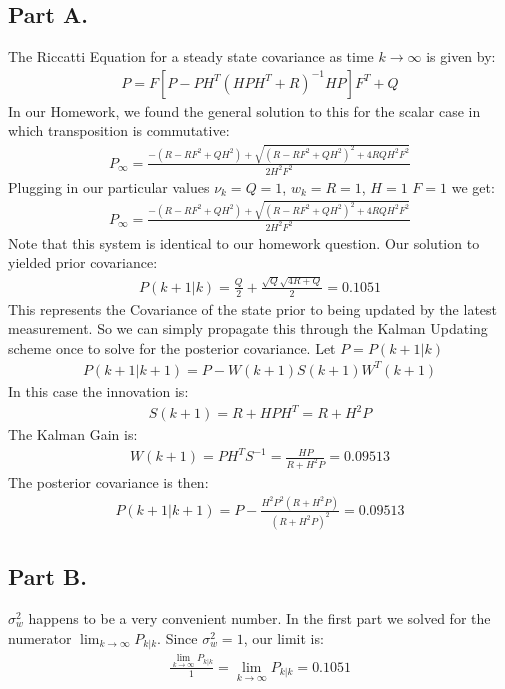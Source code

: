 \documentclass{article}
\begin{document}
\subsection*{Part A.}
The Riccatti Equation for a steady state covariance as time $k\rightarrow \infty$ is given by:
\begin{align*}
P = F[P-P H^T (HPH^T + R)^{-1} HP] F^T + Q
\end{align*}
In our Homework, we found the general solution to this for the scalar case in which transposition is commutative:
\begin{align*}
P_{\infty} = \frac{-(R-RF^2+Q H^2) + \sqrt{(R-RF^2 + QH^2)^2+4RQH^2F^2}}{2H^2 F^2}
\end{align*}
Plugging in our particular values $\nu_k = Q = 1$, $w_k = R = 1$, $H=1$ $F=1$ we get:
\begin{align*}
P_{\infty} = \frac{-(R-RF^2+Q H^2) + \sqrt{(R-RF^2 + QH^2)^2+4RQH^2F^2}}{2H^2 F^2}
\end{align*}
Note that this system is identical to our homework question. Our solution to yielded prior covariance:
\begin{align*}
\boxed{ P(k+1|k) = \frac{Q}{2} + \frac{\sqrt{Q} \sqrt{4R+Q}}{2} = 0.1051 }
\end{align*}
This represents the Covariance of the state prior to being updated by the latest measurement. So we can simply propagate this through the Kalman Updating scheme once to solve for the posterior covariance. Let $P=P(k+1|k)$
\begin{align*}
P(k+1|k+1) = P - W(k+1)S(k+1)W^T(k+1)
\end{align*}
In this case the innovation is:
\begin{align*}
S(k+1) = R+H P H^T = R+ H^2 P
\end{align*}
The Kalman Gain is:
\begin{align*}
\boxed{ W(k+1) = P H^T S^{-1} = \frac{H P}{R+H^2P} = 0.09513}
\end{align*}
The posterior covariance is then:
\begin{align*}
\boxed{ P(k+1|k+1) = P - \frac{H^2 P^2 (R+ H^2 P)}{(R+H^2P)^2} = 0.09513}
\end{align*}

\subsection*{Part B.}
$\sigma^2_w$ happens to be a very convenient number. In the first part we solved for the numerator $\lim_{k \rightarrow \infty} P_{k|k}$. Since $\sigma^2_w=1$, our limit is:
\begin{align*}
\frac{\lim_{k \rightarrow \infty} P_{k|k}}{1} = \lim_{k \rightarrow \infty} P_{k|k} = 0.1051
\end{align*}
\end{document}
